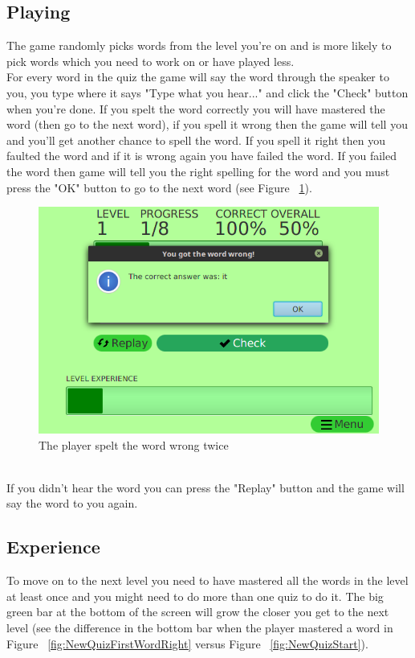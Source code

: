 \documentclass[12pt,a4paper,titlepage,onecolumn]{article}
\begin{document}
		\subsection{Playing}
		The game randomly picks words from the level you're on and is more likely to pick words which you need to work on or have played less.\\
		For every word in the quiz the game will say the word through the speaker to you, you type where it says "Type what you hear..." and click the "Check" button when you're done. If you spelt the word correctly you will have mastered the word (then go to the next word), if you spell it wrong then the game will tell you and you'll get another chance to spell the word. If you spell it right then you faulted the word and if it is wrong again you have failed the word. If you failed the word then game will tell you the right spelling for the word and you must press the "OK" button to go to the next word (see Figure ~\ref{fig:NewQuizSecondWordWrong}).
		\begin{figure}[h]
		\centering
		\includegraphics[width=1\linewidth]{Figures/NewQuiz/NewQuizSecondWordWrong}
		\caption[Failed Word]{The player spelt the word wrong twice}
		\label{fig:NewQuizSecondWordWrong}
		\end{figure}\\
		If you didn't hear the word you can press the "Replay" button and the game will say the word to you again.
		\subsection{Experience}
		To move on to the next level you need to have mastered all the words in the level at least once and you might need to do more than one quiz to do it. The big green bar at the bottom of the screen will grow the closer you get to the next level (see the difference in the bottom bar when the player mastered a word in Figure ~\ref{fig:NewQuizFirstWordRight} versus Figure ~\ref{fig:NewQuizStart}).
\end{document}

